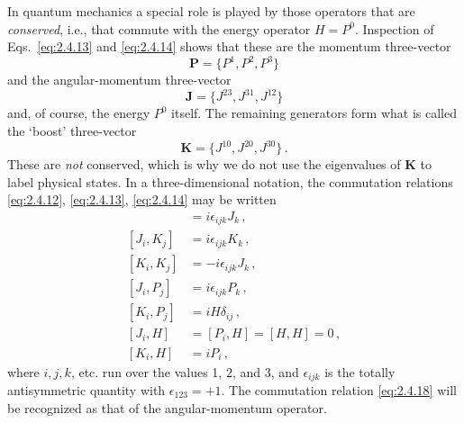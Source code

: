 In quantum mechanics a special role is played by those operators that are
\emph{conserved}, i.e., that commute with the energy operator $H=P^0$.
Inspection of Eqs.~\eqref{eq:2.4.13} and \eqref{eq:2.4.14} shows that these are the momentum
three-vector
\begin{equation}
\mathbf{P}=\{P^1,P^2,P^3\}
\tag{2.4.15}\label{eq:2.4.15}
\end{equation}
and the angular-momentum three-vector
\begin{equation}
\mathbf{J}=\{J^{23},J^{31},J^{12}\}
\tag{2.4.16}\label{eq:2.4.16}
\end{equation}
and, of course, the energy $P^0$ itself. The remaining generators form what is
called the `boost' three-vector
\begin{equation}
\mathbf{K}=\{J^{10},J^{20},J^{30}\}\,.
\tag{2.4.17}\label{eq:2.4.17}
\end{equation}
These are \emph{not} conserved, which is why we do not use the eigenvalues of
$\mathbf{K}$ to label physical states. In a three-dimensional notation, the
commutation relations \eqref{eq:2.4.12}, \eqref{eq:2.4.13}, \eqref{eq:2.4.14} may be written
\begin{align}
[J_i,J_j]&=i\epsilon_{ijk}J_k\,, \tag{2.4.18}\label{eq:2.4.18}\\
[J_i,K_j]&=i\epsilon_{ijk}K_k\,, \tag{2.4.19}\label{eq:2.4.19}\\
[K_i,K_j]&=-i\epsilon_{ijk}J_k\,, \tag{2.4.20}\label{eq:2.4.20}\\
[J_i,P_j]&=i\epsilon_{ijk}P_k\,, \tag{2.4.21}\label{eq:2.4.21}\\
[K_i,P_j]&=iH\delta_{ij}\,, \tag{2.4.22}\label{eq:2.4.22}\\
[J_i,H]&=[P_i,H]=[H,H]=0\,, \tag{2.4.23}\label{eq:2.4.23}\\
[K_i,H]&=iP_i\,, \tag{2.4.24}\label{eq:2.4.24}
\end{align}
where $i,j,k$, etc. run over the values 1, 2, and 3, and $\epsilon_{ijk}$ is
the totally antisymmetric quantity with $\epsilon_{123}=+1$. The commutation
relation \eqref{eq:2.4.18} will be recognized as that of the angular-momentum operator.

